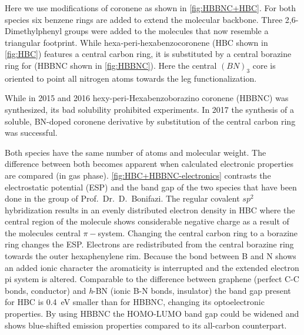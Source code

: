 
Here we use modifications of coronene as shown in \autoref{fig:HBBNC+HBC}. For both species six benzene rings are added to extend the molecular backbone. Three 2,6-Dimethylphenyl groups were added to the molecules that now resemble a triangular footprint. While hexa‐peri‐hexabenzocoronene (HBC shown in \autoref{fig:HBC}) features a central carbon ring, it is substituted by a central borazine ring for (HBBNC shown in \autoref{fig:HBBNC}). Here the central $(BN)_3$ core is oriented to point all nitrogen atoms towards the leg functionalization.

While in 2015 \cite{Krieg_construction_2015} and 2016 \cite{Ciccullo_Quasi-Free-Standing_2016} hexy-peri-Hexabenzoborazino coronene (HBBNC) was synthesized, its bad solubility prohibited experiments. In 2017 the synthesis \cite{dosso_synthesis_2017} of a soluble, BN-doped coronene derivative by substitution of the central carbon ring was successful. 

Both species have the same number of atoms and molecular weight. The difference between both becomes apparent when calculated electronic properties are compared (in gas phase). \autoref{fig:HBC+HBBNC-electronics} contrasts the electrostatic potential (ESP) and the band gap of the two species that have been done in the group of Prof.\ Dr.\ D.\ Bonifazi. The regular covalent $sp^2$ hybridization results in an evenly distributed electron density in HBC where the central region of the molecule shows considerable negative charge as a result of the molecules central $\pi-$system. Changing the central carbon ring to a borazine ring changes the ESP. Electrons are redistributed from the central borazine ring towards the outer hexaphenylene rim. Because the bond between B and N shows an added ionic character the aromaticity is interrupted and the extended electron pi system is altered. Comparable to the difference between graphene (perfect C-C bonds, conductor) and \textit{h}-BN (ionic B-N bonds, insulator) the band gap present for HBC is \SI{0.4}{\eV} smaller than for HBBNC, changing its optoelectronic properties. By using HBBNC the HOMO-LUMO band gap could be widened and shows blue-shifted emission properties\cite{dosso_synthesis_2017} compared to its all-carbon counterpart.

